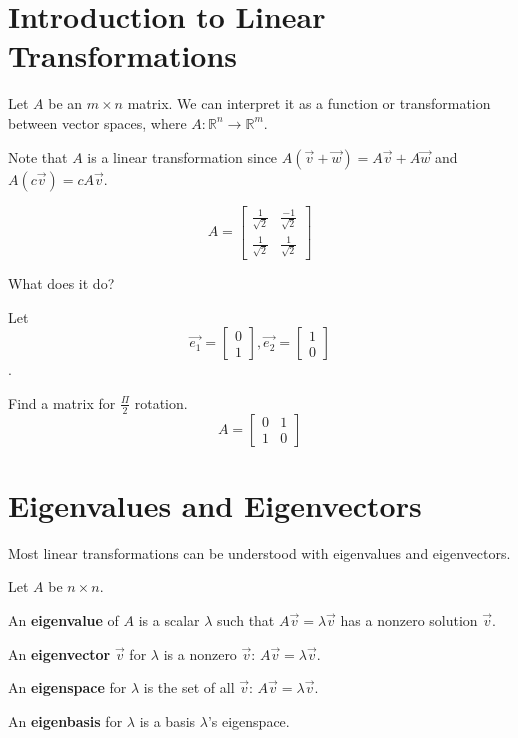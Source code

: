 \documentclass[../main.tex]{subfiles}
\begin{document}
\section{Introduction to Linear Transformations}

Let \( A \) be an \( m \times n \) matrix. We can interpret it as a function or transformation between vector spaces,
where \( A: \mathbb{R}^n \rightarrow \mathbb{R}^m \).

Note that \( A \) is a linear transformation since \( A(\vec{v}+\vec{w}) = A\vec{v} + A\vec{w} \)
and \( A(c\vec{v}) = cA\vec{v} \).

\begin{example}[]
    \[ A = \begin{bmatrix}
        \frac{1}{\sqrt{2}} & \frac{-1}{\sqrt{2}} \\
        \frac{1}{\sqrt{2}} & \frac{1}{\sqrt{2}}
    \end{bmatrix} \]

    What does it do?

    Let \[ \vec{e_1} = \begin{bmatrix} 0 \\ 1 \end{bmatrix}, \vec{e_2} = \begin{bmatrix} 1 \\ 0 \end{bmatrix} \].
\end{example}

\begin{example}
    Find a matrix for \( \frac{\Pi}{2} \) rotation.
    \[ A =\begin{bmatrix}
        0 & 1 \\
        1 & 0
    \end{bmatrix} \]
\end{example}


\section{Eigenvalues and Eigenvectors}

Most linear transformations can be understood with eigenvalues and eigenvectors.

\begin{definition}[]
    Let \( A \) be \( n \times n \).

    An \textbf{eigenvalue} of \( A \) is a scalar \( \lambda \) such that \( A\vec{v}=\lambda\vec{v} \)
    has a nonzero solution \(\vec{v}\).

    An \textbf{eigenvector} \( \vec{v} \) for \( \lambda \) is a nonzero \(\vec{v}\): \( A\vec{v}=\lambda\vec{v} \).

    An \textbf{eigenspace} for \( \lambda \) is the set of all \( \vec{v} \): \( A\vec{v}=\lambda\vec{v} \).

    An \textbf{eigenbasis} for \( \lambda \) is a basis \( \lambda \)'s eigenspace.

\end{definition}
\end{document}
